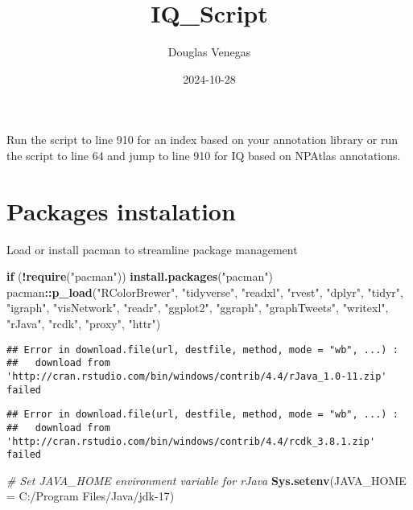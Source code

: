 \documentclass[
]{article}
\title{IQ\_Script}
\author{Douglas Venegas}
\date{2024-10-28}
\newenvironment{Shaded}{\begin{snugshade}}{\end{snugshade}}
\newcommand{\AttributeTok}[1]{\textcolor[rgb]{0.13,0.29,0.53}{#1}}
\newcommand{\CommentTok}[1]{\textcolor[rgb]{0.56,0.35,0.01}{\textit{#1}}}
\newcommand{\ControlFlowTok}[1]{\textcolor[rgb]{0.13,0.29,0.53}{\textbf{#1}}}
\newcommand{\FunctionTok}[1]{\textcolor[rgb]{0.13,0.29,0.53}{\textbf{#1}}}
\newcommand{\NormalTok}[1]{#1}
\newcommand{\SpecialCharTok}[1]{\textcolor[rgb]{0.81,0.36,0.00}{\textbf{#1}}}
\newcommand{\StringTok}[1]{\textcolor[rgb]{0.31,0.60,0.02}{#1}}
\begin{document}
\maketitle

{
\setcounter{tocdepth}{3}
\tableofcontents
}
Run the script to line 910 for an index based on your annotation library
or run the script to line 64 and jump to line 910 for IQ based on
NPAtlas annotations.

\section{Packages instalation}\label{packages-instalation}

Load or install pacman to streamline package management

\begin{Shaded}
\begin{Highlighting}[]
\ControlFlowTok{if}\NormalTok{ (}\SpecialCharTok{!}\FunctionTok{require}\NormalTok{(}\StringTok{"pacman"}\NormalTok{)) }\FunctionTok{install.packages}\NormalTok{(}\StringTok{"pacman"}\NormalTok{)}
\NormalTok{pacman}\SpecialCharTok{::}\FunctionTok{p\_load}\NormalTok{(}\StringTok{"RColorBrewer"}\NormalTok{, }\StringTok{"tidyverse"}\NormalTok{, }\StringTok{"readxl"}\NormalTok{, }\StringTok{"rvest"}\NormalTok{, }\StringTok{"dplyr"}\NormalTok{, }\StringTok{"tidyr"}\NormalTok{, }\StringTok{"igraph"}\NormalTok{, }\StringTok{"visNetwork"}\NormalTok{, }
               \StringTok{"readr"}\NormalTok{, }\StringTok{"ggplot2"}\NormalTok{, }\StringTok{"ggraph"}\NormalTok{, }\StringTok{"graphTweets"}\NormalTok{, }\StringTok{"writexl"}\NormalTok{, }\StringTok{"rJava"}\NormalTok{, }\StringTok{"rcdk"}\NormalTok{, }\StringTok{"proxy"}\NormalTok{, }\StringTok{"httr"}\NormalTok{)}
\end{Highlighting}
\end{Shaded}

\begin{verbatim}
## Error in download.file(url, destfile, method, mode = "wb", ...) : 
##   download from 'http://cran.rstudio.com/bin/windows/contrib/4.4/rJava_1.0-11.zip' failed
\end{verbatim}

\begin{verbatim}
## Error in download.file(url, destfile, method, mode = "wb", ...) : 
##   download from 'http://cran.rstudio.com/bin/windows/contrib/4.4/rcdk_3.8.1.zip' failed
\end{verbatim}

\begin{Shaded}
\begin{Highlighting}[]
\CommentTok{\# Set JAVA\_HOME environment variable for rJava}
\FunctionTok{Sys.setenv}\NormalTok{(}\AttributeTok{JAVA\_HOME =} \StringTok{\textquotesingle{}C:/Program Files/Java/jdk{-}17\textquotesingle{}}\NormalTok{)}
\end{Highlighting}
\end{Shaded}
\end{document}
